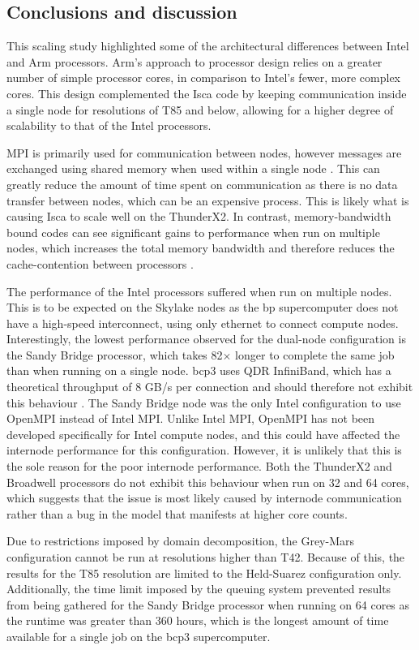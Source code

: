\documentclass[a4paper,11pt]{report}
\begin{document}
\subsection{Conclusions and discussion}
This scaling study highlighted some of the architectural differences between Intel and Arm processors. Arm's approach to processor design relies on a greater number of simple processor cores, in comparison to Intel's fewer, more complex cores. This design complemented the Isca code by keeping communication inside a single node for resolutions of T85 and below, allowing for a higher degree of scalability to that of the Intel processors.
\par
MPI is primarily used for communication between nodes, however messages are exchanged using shared memory when used within a single node \cite{mpi2015standard}. This can greatly reduce the amount of time spent on communication as there is no data transfer between nodes, which can be an expensive process. This is likely what is causing Isca to scale well on the ThunderX2. In contrast, memory-bandwidth bound codes can see significant gains to performance when run on multiple nodes, which increases the total memory bandwidth and therefore reduces the cache-contention between processors \cite{milfeld2014hpc}.
\par
The performance of the Intel processors suffered when run on multiple nodes. This is to be expected on the Skylake nodes as the \gls{bp} supercomputer does not have a high-speed interconnect, using only ethernet to connect compute nodes. Interestingly, the lowest performance observed for the dual-node configuration is the Sandy Bridge processor, which takes 82$\times$ longer to complete the same job than when running on a single node. \gls{bcp3} uses QDR InfiniBand, which has a theoretical throughput of 8 GB/s per connection and should therefore not exhibit this behaviour \cite{grun2010introduction}. The Sandy Bridge node was the only Intel configuration to use OpenMPI instead of Intel MPI. Unlike Intel MPI, OpenMPI has not been developed specifically for Intel compute nodes, and this could have affected the internode performance for this configuration. However, it is unlikely that this is the sole reason for the poor internode performance. Both the ThunderX2 and Broadwell processors do not exhibit this behaviour when run on 32 and 64 cores, which suggests that the issue is most likely caused by internode communication rather than a bug in the model that manifests at higher core counts.
\par
Due to restrictions imposed by domain decomposition, the Grey-Mars configuration cannot be run at resolutions higher than T42. Because of this, the results for the T85 resolution are limited to the Held-Suarez configuration only. Additionally, the time limit imposed by the queuing system prevented results from being gathered for the Sandy Bridge processor when running on 64 cores as the runtime was greater than 360 hours, which is the longest amount of time available for a single job on the \gls{bcp3} supercomputer.
\end{document}
